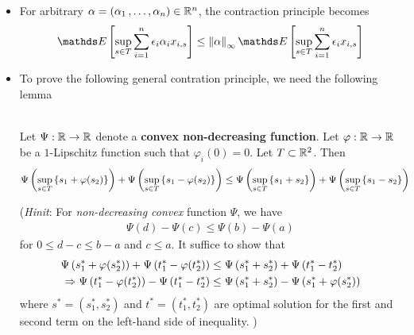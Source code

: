 \documentclass[11pt]{article}
\begin{document}
\begin{itemize}
\item \begin{remark}
For arbitrary $\alpha = (\alpha_1 \,{,}\ldots{,}\, \alpha_n) \in {\mathbb R}^n$, the contraction principle becomes \citep{vershynin2018high} 
\begin{align}
\E{}{\sup_{s\in T}\sum_{i=1}^n \epsilon_i \alpha_i x_{i,s}} \le \norm{\alpha}{\infty} \E{}{\sup_{s\in T}\sum_{i=1}^n \epsilon_i  x_{i,s}}\label{ineqn: contraction_rademacher_general}
\end{align}
\end{remark}

\item To prove the following general contration principle, we need the following lemma
\begin{lemma}\citep{boucheron2013concentration, vershynin2018high}\\
Let $\Psi : {\mathbb R}\to {\mathbb R}$ denote a \textbf{convex non-decreasing function}. Let $\varphi: {\mathbb R} \to {\mathbb R}$ be a $1$-Lipschitz function such that $\varphi_i(0) = 0$. Let $T \subset {\mathbb R}^2$. Then
\begin{align*}
\Psi\left(\sup_{s \in T}\left\{s_1 + \varphi(s_2)\right\}\right) + \Psi\left(\sup_{s \in T}\left\{s_1 - \varphi(s_2)\right\}\right) &\le \Psi\left(\sup_{s \in T}\left\{s_1 + s_2\right\}\right) + \Psi\left(\sup_{s \in T}\left\{s_1 - s_2\right\}\right)
\end{align*}
\end{lemma} (\emph{Hinit}: For \emph{non-decreasing convex} function $\Psi$,  we have
\begin{align*}
\Psi(d) - \Psi(c) \le \Psi(b) - \Psi(a)
\end{align*} for $0 \le d- c \le b- a$ and $c\le a$. It suffice to show that 
\begin{align*}
\Psi\left(s_1^{*} + \varphi(s_2^{*})\right) + \Psi\left(t_1^{*} - \varphi(t_2^{*})\right) &\le \Psi\left(s_1^{*} + s_2^{*}\right) + \Psi\left(t_1^{*} - t_2^{*}\right)\\
\Rightarrow   \Psi\left(t_1^{*} - \varphi(t_2^{*})\right)  - \Psi\left(t_1^{*} - t_2^{*}\right) &\le \Psi\left(s_1^{*} + s_2^{*}\right) - \Psi\left(s_1^{*} + \varphi(s_2^{*})\right) 
\end{align*} where $s^{*} = (s_1^{*}, s_2^{*})$ and $t^{*} = (t_1^{*}, t_2^{*})$ are optimal solution for the first and second term on the left-hand side of inequality. )


\end{itemize}
\end{document}
